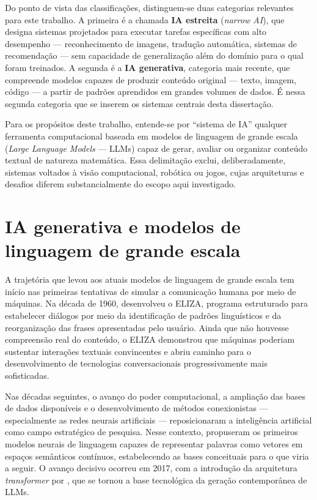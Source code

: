 Do ponto de vista das classificações, distinguem-se duas categorias relevantes para este
trabalho. A primeira é a chamada \textbf{IA estreita} (\emph{narrow AI}), que designa sistemas
projetados para executar tarefas específicas com alto desempenho --- reconhecimento de imagens,
tradução automática, sistemas de recomendação --- sem capacidade de generalização além do
domínio para o qual foram treinados. A segunda é a \textbf{IA generativa}, categoria mais
recente, que compreende modelos capazes de produzir conteúdo original --- texto, imagem, código
--- a partir de padrões aprendidos em grandes volumes de dados. É nessa segunda categoria que se
inserem os sistemas centrais desta dissertação.

Para os propósitos deste trabalho, entende-se por ``sistema de IA'' qualquer ferramenta
computacional baseada em modelos de linguagem de grande escala (\emph{Large Language Models} ---
LLMs) capaz de gerar, avaliar ou organizar conteúdo textual de natureza matemática. Essa
delimitação exclui, deliberadamente, sistemas voltados à visão computacional, robótica ou jogos,
cujas arquiteturas e desafios diferem substancialmente do escopo aqui investigado.

\section{IA generativa e modelos de linguagem de grande escala}
\label{sec:ia-generativa}


A trajetória que levou aos atuais modelos de linguagem de grande escala tem início nas primeiras
tentativas de simular a comunicação humana por meio de máquinas. Na década de 1960,
\citet{weizenbaum1966eliza} desenvolveu o ELIZA, programa estruturado para estabelecer diálogos
por meio da identificação de padrões linguísticos e da reorganização das frases apresentadas pelo
usuário. Ainda que não houvesse compreensão real do conteúdo, o ELIZA demonstrou que máquinas
poderiam sustentar interações textuais convincentes e abriu caminho para o desenvolvimento de
tecnologias conversacionais progressivamente mais sofisticadas.

Nas décadas seguintes, o avanço do poder computacional, a ampliação das bases de dados
disponíveis e o desenvolvimento de métodos conexionistas --- especialmente as redes neurais
artificiais --- reposicionaram a inteligência artificial como campo estratégico de pesquisa.
Nesse contexto, \citet{bengio2003neural} propuseram os primeiros modelos neurais de linguagem
capazes de representar palavras como vetores em espaços semânticos contínuos, estabelecendo as
bases conceituais para o que viria a seguir. O avanço decisivo ocorreu em 2017, com a introdução
da arquitetura \emph{transformer} por \citet{vaswani2017attention}, que se tornou a base
tecnológica da geração contemporânea de LLMs.

